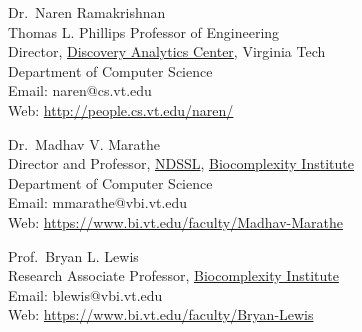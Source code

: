 \begin{minipage}[t]{0.5\textwidth}

Dr.\ Naren Ramakrishnan\\
Thomas L. Phillips Professor of Engineering\\
Director, \href{dac.cs.vt.edu}{Discovery Analytics Center}, Virginia Tech\\
Department of Computer Science\\
Email: naren@cs.vt.edu\\
Web: \href{http://people.cs.vt.edu/naren/}{http://people.cs.vt.edu/naren/}\\

\end{minipage}

\begin{minipage}[t]{0.75\textwidth}

Dr.\ Madhav V. Marathe\\
Director and Professor, \href{https://www.bi.vt.edu/research/Network-Dynamics-and-Simulation-Science-Laboratory}{NDSSL}, \href{https://www.bi.vt.edu/}{Biocomplexity Institute}\\
Department of Computer Science\\
Email: mmarathe@vbi.vt.edu\\
Web: \href{https://www.bi.vt.edu/faculty/Madhav-Marathe}{https://www.bi.vt.edu/faculty/Madhav-Marathe}\\

\end{minipage}

\begin{minipage}[t]{0.75\textwidth}

Prof.\ Bryan L. Lewis\\
Research Associate Professor, \href{https://www.bi.vt.edu/}{Biocomplexity Institute}\\
Email: blewis@vbi.vt.edu\\
Web: \href{https://www.bi.vt.edu/faculty/Bryan-Lewis}{https://www.bi.vt.edu/faculty/Bryan-Lewis}\\

\end{minipage}

